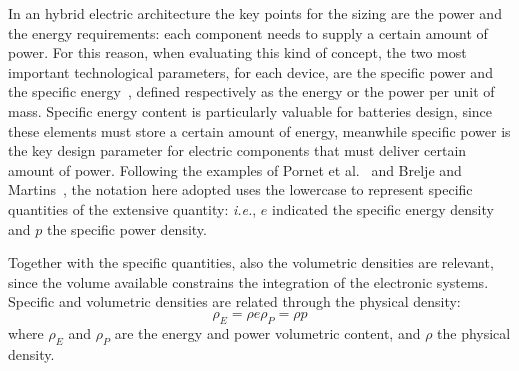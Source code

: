In an hybrid electric architecture the key points for the sizing are the power and the energy requirements: each component needs to supply a certain amount of power. 
For this reason, when evaluating this kind of concept, the two most important technological parameters, for each device, are the specific power and the specific energy~\cite{bib:fraunhofer, bib:naec}, defined respectively as the energy or the power per unit of mass. 
Specific energy content is particularly valuable for batteries design, since these elements must store a certain amount of energy, meanwhile specific power is the key design parameter for electric components that must deliver certain amount of power. 
Following the examples of Pornet et al.~\cite{bib:pornet, bib:pornet_book} and Brelje and Martins~\cite{bib:brelje_biblio}, the notation here adopted uses the lowercase to represent specific quantities of the extensive quantity: \textit{i.e.}, $e$ indicated the specific energy density and $p$ the specific power density. 

Together with the specific quantities, also the volumetric densities are relevant, since the volume available constrains the integration of the electronic systems. 
Specific and volumetric densities are related through the physical density:
\begin{subequations}
	\begin{equation}
	\rho_E = \rho e 
	\label{eq:energy_density}
	\end{equation}
	\begin{equation}
	\rho_P = \rho p
	\label{eq:power_density}
	\end{equation}
\end{subequations}
where $\rho_E$ and $\rho_P$ are the energy and power volumetric content, and $\rho$ the physical density. 

